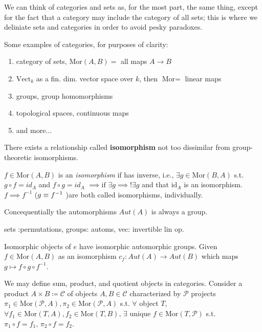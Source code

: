 \documentclass[12pt,oneside]{report}
\begin{document}
We can think of categories and sets as, for the most part, the same thing, except for the fact that a category may include the category of all sets; this is where we deliniate sets and categories in order to avoid pesky paradoxes. 

Some examples of categories, for purposes of clarity:
\begin{enumerate}
  \item category of sets, \( \text{Mor}(A,B)= \) all maps \( A \to  B \)
  \item \( \text{Vect}_k \) as a fin. dim. vector space over \( k \), then \( \text{Mor}= \) linear maps
  \item groups, group homomorphisms 
  \item topological spaces, continuous maps
  \item and more...
\end{enumerate}

There exists a relationship called \textbf{isomorphism} not too dissimilar from group-theoretic isomorphisms. 

\begin{definition}[Isomorphism]
  \( f \in  \text{Mor}(A,B) \) is an \textit{isomorphism} if has inverse, i.e., \( \exists g \in  \text{Mor}(B,A) \) s.t. \( g \circ f =id_A \) and \( f \circ g =id_A \) \( \implies \text{if }\exists g \implies !\exists g \) and that \( \text{id}_A \) is an isomorphism. \( f \implies f^{-1} \) (\( g\equiv f^{-1} \\ \) )are both called isomorphisms, individually. 
  
\end{definition}
  Concequentially the automorphisms \( Aut(A) \) is always a group. 

sets :permutations, groups: automs, vec: invertible lin op. 

Isomorphic objects of \( e \) have isomorphic automorphic groups. Given \( f \in  \text{Mor}(A,B) \) as an isomorphism \( c_f:Aut(A) \to  Aut(B) \) which maps \( g \mapsto f \circ g \circ f^{-1} \). 

We may define sum, product, and quotient objects in categories. Consider a product \( A\times B \coloneqq \mathcal{C} \) of objects \( A,B \in  \mathscr{C} \) characterized by \( \mathcal{P} \) projects \( \pi_1 \in \text{Mor}(\mathcal{P},A), \pi_{2}\in \text{Mor}(\mathcal{P}, A) \) s.t. \( \forall  \) object \( T \), \( \forall f_{1}\in \text{Mor}(T,A), f_{2}\in \text{Mor}(T,B), \, \exists \) unique \( f \in \text{Mor}(T,\mathcal{P}) \) s.t. \( \pi_{1} \circ f =f_1, \, \pi_{2}\circ f=f_{2} \). 
\end{document}
